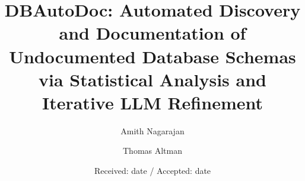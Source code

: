 \documentclass[twocolumn]{svjour3}
\begin{document}
\title{DBAutoDoc: Automated Discovery and Documentation of Undocumented Database Schemas via Statistical Analysis and Iterative LLM Refinement}

\author{Amith Nagarajan \and Thomas Altman}


\date{Received: date / Accepted: date}

\maketitle
\end{document}
